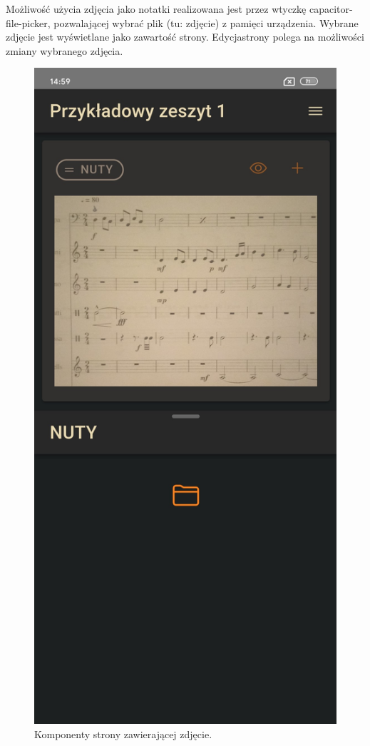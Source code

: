 Możliwość użycia zdjęcia jako notatki realizowana jest przez wtyczkę capacitor-file-picker,
pozwalającej wybrać plik (tu: zdjęcie) z pamięci urządzenia. Wybrane zdjęcie jest wyświetlane jako zawartość strony.
Edycjastrony polega na możliwości zmiany wybranego zdjęcia.

\begin{figure}[H]
	\begin{center}
		\includegraphics[scale=0.2]{media/PhotoPage.jpg}
	\end{center}
	\caption{Komponenty strony zawierającej zdjęcie.}
	\label{rys:photo-page}
\end{figure}

